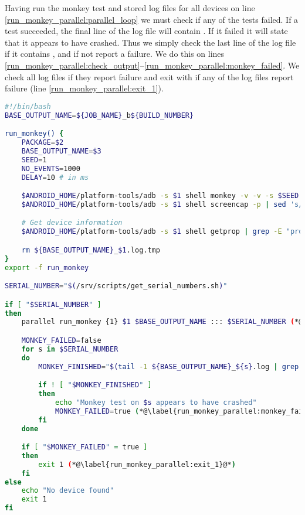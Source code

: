 Having run the monkey test and stored log files for all devices on line \ref{run_monkey_parallel:parallel_loop} we must check if any of the tests failed. If a test succeeded, the final line of the log file will contain . If it failed it will state that it appears to have crashed. Thus we simply check the last line of the log file if it contains , and if not report a failure. We do this on lines \ref{run_monkey_parallel:check_output}--\ref{run_monkey_parallel:monkey_failed}. We check all log files if they report failure and exit with  if any of the log files report failure (line \ref{run_monkey_parallel:exit_1}).

\begin{lstlisting}[language=bash,caption=Script that runs monkey tests on all connected devices in parallel,label=lst:run_monkey_parallel]
#!/bin/bash
BASE_OUTPUT_NAME=${JOB_NAME}_b${BUILD_NUMBER}

run_monkey() {
    PACKAGE=$2
    BASE_OUTPUT_NAME=$3
    SEED=1
    NO_EVENTS=1000
    DELAY=10 # in ms

    $ANDROID_HOME/platform-tools/adb -s $1 shell monkey -v -v -s $SEED --throttle $DELAY -p $PACKAGE $NO_EVENTS > ${BASE_OUTPUT_NAME}_$1.log.tmp (*@\label{run_monkey_parallel:run_monkey_test}@*)
    $ANDROID_HOME/platform-tools/adb -s $1 shell screencap -p | sed 's/\r$//' > ${BASE_OUTPUT_NAME}_$1.png (*@\label{run_monkey_parallel:screenshot}@*)

    # Get device information
    $ANDROID_HOME/platform-tools/adb -s $1 shell getprop | grep -E "product|sdk|serial" | grep -v ro.boot | cat - ${BASE_OUTPUT_NAME}_$1.log.tmp > ${BASE_OUTPUT_NAME}_$1.log (*@\label{run_monkey_parallel:device_info}@*)

    rm ${BASE_OUTPUT_NAME}_$1.log.tmp
}
export -f run_monkey

SERIAL_NUMBER="$(/srv/scripts/get_serial_numbers.sh)"

if [ "$SERIAL_NUMBER" ]
then
    parallel run_monkey {1} $1 $BASE_OUTPUT_NAME ::: $SERIAL_NUMBER (*@\label{run_monkey_parallel:parallel_loop}@*)

    MONKEY_FAILED=false
    for s in $SERIAL_NUMBER
    do
        MONKEY_FINISHED="$(tail -1 ${BASE_OUTPUT_NAME}_${s}.log | grep -i "monkey finished")" (*@\label{run_monkey_parallel:check_output}@*)

        if ! [ "$MONKEY_FINISHED" ]
        then
            echo "Monkey test on $s appears to have crashed"
            MONKEY_FAILED=true (*@\label{run_monkey_parallel:monkey_failed}@*)
        fi
    done

    if [ "$MONKEY_FAILED" = true ]
    then
        exit 1 (*@\label{run_monkey_parallel:exit_1}@*)
    fi
else
    echo "No device found"
    exit 1
fi
\end{lstlisting}